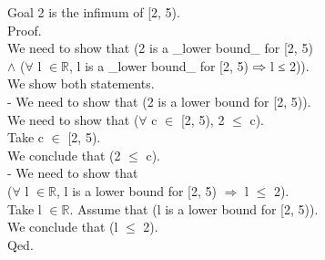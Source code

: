 {
\begin{leancode}
  Goal 2 is the infimum of [2, 5). \\
  Proof. \\
  We need to show that (2 is a \_lower bound\_ for [2, 5) \\
  \tab $\land$ ($\forall$ l $\in \mathbb{R}$, l is a \_lower bound\_ for [2, 5) $\rightwhitearrow$ l ≤ 2)). \\
  We show both statements. \\
  \tab - We need to show that (2 is a lower bound for [2, 5)). \\
  \tab \tab We need to show that ($\forall$ c $\in$ [2, 5), 2 $\le$ c). \\
  \tab \tab Take c $\in$ [2, 5). \\
  \tab \tab We conclude that (2 $\le$ c). \\
  \tab - We need to show that \\
  \tab \tab ($\forall$ l $\in \mathbb{R}$, l is a lower bound for [2, 5) $\Rightarrow$ l $\le$ 2). \\
  \tab \tab Take l $\in \mathbb{R}$. Assume that (l is a lower bound for [2, 5)). \\
  \tab \tab We conclude that (l $\le$ 2). \\
  Qed. \\
\end{leancode}
}
